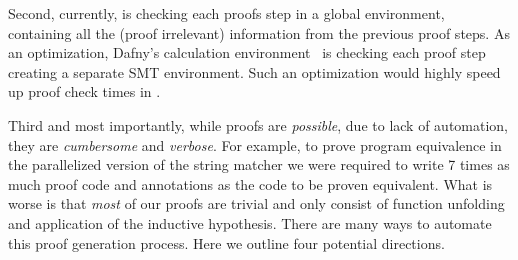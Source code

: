 Second, 
currently, \toolname 
is checking each proofs step 
in a global environment, 
containing all the (proof irrelevant) information 
from the previous proof steps. 
%
As an optimization, Dafny's calculation environment~\cite{LeinoPolikarpova16}
is checking each proof step creating a separate SMT environment. 
%
Such an optimization would highly speed up proof check times in \toolname.


Third and most importantly, 
while proofs are \emph{possible}, 
due to lack of automation, they are
\emph{cumbersome} and \emph{verbose}.
%
For example, to prove program equivalence in the parallelized version 
of the string matcher we were required to write 7 times 
as much proof code and annotations as the code to be proven equivalent. 
%
What is worse is that \emph{most} of our proofs are trivial and only consist of 
function unfolding and application of the inductive hypothesis.
There are many ways to automate this proof generation process. Here 
we outline four potential directions. 
